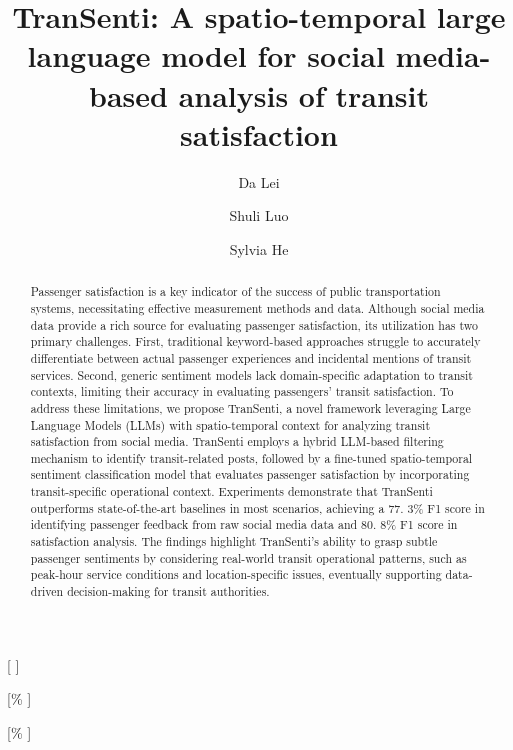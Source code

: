 \documentclass[a4paper,fleqn,12pt]{cas-sc}
\begin{document}
\let\WriteBookmarks\relax
\def\floatpagepagefraction{1}
\def\textpagefraction{.001}

\title [mode = title]{TranSenti: A spatio-temporal large language model for social media-based analysis of transit satisfaction} 

\author[1]{Da Lei}[%
]

\address[1]{Department of Geography and Resource Management, The Chinese University of Hong Kong, Hong Kong, China}
\address[2]{School of Humanities and Social Science, The Chinese University of Hong Kong, Shenzhen, China}

\author[2]{Shuli Luo}[\%
]

\author[1]{Sylvia He}[\%
]
\cormark[1]




\begin{abstract}
Passenger satisfaction is a key indicator of the success of public transportation systems, necessitating effective measurement methods and data. Although social media data provide a rich source for evaluating passenger satisfaction, its utilization has two primary challenges. First, traditional keyword-based approaches struggle to accurately differentiate between actual passenger experiences and incidental mentions of transit services. Second, generic sentiment models lack domain-specific adaptation to transit contexts, limiting their accuracy in evaluating passengers' transit satisfaction. To address these limitations, we propose TranSenti, a novel framework leveraging Large Language Models (LLMs) with spatio-temporal context for analyzing transit satisfaction from social media. TranSenti employs a hybrid LLM-based filtering mechanism to identify transit-related posts, followed by a fine-tuned spatio-temporal sentiment classification model that evaluates passenger satisfaction by incorporating transit-specific operational context. Experiments demonstrate that TranSenti outperforms state-of-the-art baselines in most scenarios, achieving a 77. 3\% F1 score in identifying passenger feedback from raw social media data and 80. 8\% F1 score in satisfaction analysis. The findings highlight TranSenti's ability to grasp subtle passenger sentiments by considering real-world transit operational patterns, such as peak-hour service conditions and location-specific issues, eventually supporting data-driven decision-making for transit authorities.
\end{abstract}
\end{document}

